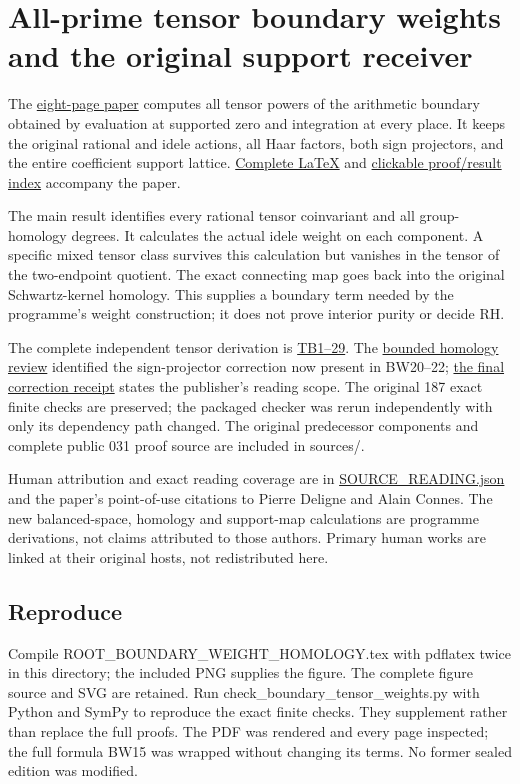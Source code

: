 \documentclass[
]{article}
\author{}
\date{}
\begin{document}
\section{All-prime tensor boundary weights and the original support
receiver}\label{all-prime-tensor-boundary-weights-and-the-original-support-receiver}

The \href{ROOT_BOUNDARY_WEIGHT_HOMOLOGY.pdf}{eight-page paper} computes
all tensor powers of the arithmetic boundary obtained by evaluation at
supported zero and integration at every place. It keeps the original
rational and idele actions, all Haar factors, both sign projectors, and
the entire coefficient support lattice.
\href{ROOT_BOUNDARY_WEIGHT_HOMOLOGY.tex}{Complete LaTeX} and
\href{RESULT_INDEX.json}{clickable proof/result index} accompany the
paper.

The main result identifies every rational tensor coinvariant and all
group-homology degrees. It calculates the actual idele weight on each
component. A specific mixed tensor class survives this calculation but
vanishes in the tensor of the two-endpoint quotient. The exact
connecting map goes back into the original Schwartz-kernel homology.
This supplies a boundary term needed by the programme's weight
construction; it does not prove interior purity or decide RH.

The complete independent tensor derivation is
\href{INDEPENDENT_BOUNDARY_TENSOR_WEIGHTS.tex}{TB1--29}. The
\href{INDEPENDENT_BOUNDARY_HOMOLOGY_AUDIT.md}{bounded homology review}
identified the sign-projector correction now present in BW20--22;
\href{LITERATURE_BOUNDARY_RECEIVER_REVIEW.md}{the final correction
receipt} states the publisher's reading scope. The original 187 exact
finite checks are preserved; the packaged checker was rerun
independently with only its dependency path changed. The original
predecessor components and complete public 031 proof source are included
in sources/.

Human attribution and exact reading coverage are in
\url{SOURCE_READING.json} and the paper's point-of-use citations to
Pierre Deligne and Alain Connes. The new balanced-space, homology and
support-map calculations are programme derivations, not claims
attributed to those authors. Primary human works are linked at their
original hosts, not redistributed here.

\subsection{Reproduce}\label{reproduce}

Compile ROOT\_BOUNDARY\_WEIGHT\_HOMOLOGY.tex with pdflatex twice in this
directory; the included PNG supplies the figure. The complete figure
source and SVG are retained. Run check\_boundary\_tensor\_weights.py
with Python and SymPy to reproduce the exact finite checks. They
supplement rather than replace the full proofs. The PDF was rendered and
every page inspected; the full formula BW15 was wrapped without changing
its terms. No former sealed edition was modified.
\end{document}
